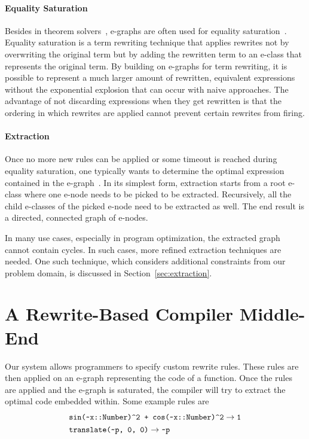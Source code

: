 \paragraph{Equality Saturation}
Besides in theorem solvers~\cite{demouraEfficientEMatchingSMT2007,nelsonTechniquesProgramVerification1979,demouraZ3EfficientSMT2008}, e-graphs are often used for equality saturation~\cite{willseyEggFastExtensible2021,cheliMetatheoryjlFastElegant2021,tateEqualitySaturationNew2009}.
Equality saturation is a term rewriting technique that applies rewrites not by overwriting the original term but by adding the rewritten term to an e-class that represents the original term.
By building on e-graphs for term rewriting, it is possible to represent a much larger amount of rewritten, equivalent expressions without the exponential explosion that can occur with naive approaches.
The advantage of not discarding expressions when they get rewritten is that the ordering in which rewrites are applied cannot prevent certain rewrites from firing. 

\paragraph{Extraction}
Once no more new rules can be applied or some timeout is reached during equality saturation, one typically wants to determine the optimal expression contained in the e-graph~\cite{willseyEggFastExtensible2021,goharshadyFastOptimalExtraction2024}.
In its simplest form, extraction starts from a root e-class where one e-node needs to be picked to be extracted. Recursively, all the child e-classes of the picked e-node need to be extracted as well.
The end result is a directed, connected graph of e-nodes.

In many use cases, especially in program optimization, the extracted graph cannot contain cycles.
In such cases, more refined extraction techniques are needed.
One such technique, which considers additional constraints from our problem domain, is discussed in Section~\ref{sec:extraction}.

\section{A Rewrite-Based Compiler Middle-End}
\label{sec:rewriter}
Our system allows programmers to specify custom rewrite rules.
These rules are then applied on an e-graph representing the code of a function. Once the rules are applied and the e-graph is saturated, the compiler will try to extract the optimal code embedded within. Some example rules are 
\begin{align*}
&\code{sin(\char`\~x::Number)\char`\^2 + cos(\char`\~x::Number)\char`\^2} \rightarrow \code{1}
\\
&\code{translate(\char`\~p, 0, 0)} \rightarrow \code{\char`\~p}
\end{align*}


